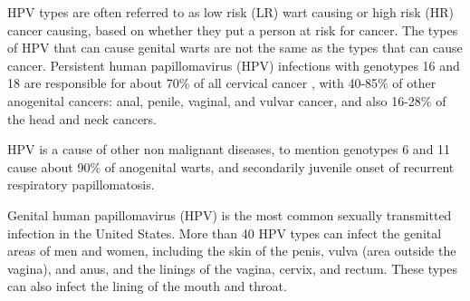 HPV types are often referred to as low risk (LR) wart causing or high risk (HR) cancer causing, based on whether they put a person at risk for cancer.  The types of HPV that can cause genital warts are not the same as the types that can cause cancer.
Persistent human papillomavirus (HPV) infections with genotypes 16 and 18 are responsible for about 70\% of all cervical cancer 
, with 40-85\% of other anogenital cancers: anal, penile, vaginal, and vulvar cancer, and also 16-28\% of the head and neck cancers.

HPV is a cause of other non malignant diseases, to mention genotypes 6 and 11 cause about 90\% of anogenital warts, and secondarily juvenile onset of recurrent respiratory papillomatosis.

Genital human papillomavirus (HPV) is the most common sexually transmitted infection in the United States. More than 40 HPV types can infect the genital areas of men and women, including the skin of the penis, vulva (area outside the vagina), and anus, and the linings of the vagina, cervix, and rectum. These types can also infect the lining of the mouth and throat.

